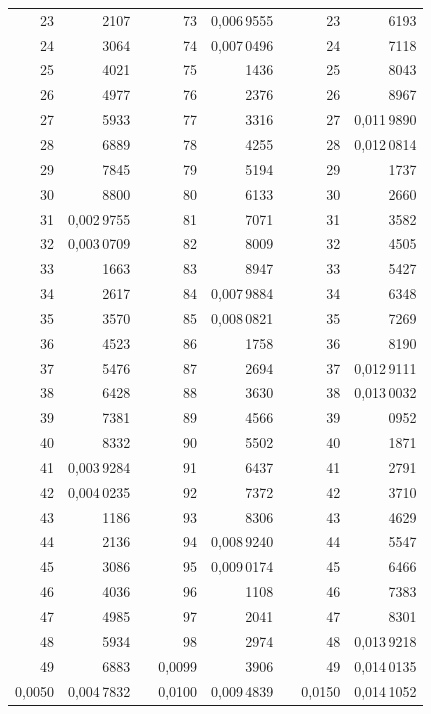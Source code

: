 \begin{tabular}{|r|r|@{}p{9pt}@{}|r|r|@{}p{9pt}@{}|r|r|}
23 & 2107 &  & 73 & 0,006\,9555 &  & 23 & 6193 \\
24 & 3064 &  & 74 & 0,007\,0496 &  & 24 & 7118 \\
25 & 4021 &  & 75 & 1436 &  & 25 & 8043 \\[3pt]
26 & 4977 &  & 76 & 2376 &  & 26 & 8967 \\
27 & 5933 &  & 77 & 3316 &  & 27 & 0,011\,9890 \\
28 & 6889 &  & 78 & 4255 &  & 28 & 0,012\,0814 \\
29 & 7845 &  & 79 & 5194 &  & 29 & 1737 \\
30 & 8800 &  & 80 & 6133 &  & 30 & 2660 \\[3pt]
31 & 0,002\,9755 &  & 81 & 7071 &  & 31 & 3582 \\
32 & 0,003\,0709 &  & 82 & 8009 &  & 32 & 4505 \\
33 & 1663 &  & 83 & 8947 &  & 33 & 5427 \\
34 & 2617 &  & 84 & 0,007\,9884 &  & 34 & 6348 \\
35 & 3570 &  & 85 & 0,008\,0821 &  & 35 & 7269 \\[3pt]
36 & 4523 &  & 86 & 1758 &  & 36 & 8190 \\
37 & 5476 &  & 87 & 2694 &  & 37 & 0,012\,9111 \\
38 & 6428 &  & 88 & 3630 &  & 38 & 0,013\,0032 \\
39 & 7381 &  & 89 & 4566 &  & 39 & 0952 \\
40 & 8332 &  & 90 & 5502 &  & 40 & 1871 \\[3pt]
41 & 0,003\,9284 &  & 91 & 6437 &  & 41 & 2791 \\
42 & 0,004\,0235 &  & 92 & 7372 &  & 42 & 3710 \\
43 & 1186 &  & 93 & 8306 &  & 43 & 4629 \\
44 & 2136 &  & 94 & 0,008\,9240 &  & 44 & 5547 \\
45 & 3086 &  & 95 & 0,009\,0174 &  & 45 & 6466 \\[3pt]
46 & 4036 &  & 96 & 1108 &  & 46 & 7383 \\
47 & 4985 &  & 97 & 2041 &  & 47 & 8301 \\
48 & 5934 &  & 98 & 2974 &  & 48 & 0,013\,9218 \\
49 & 6883 &  & 0,0099 & 3906 &  & 49 & 0,014\,0135 \\
0,0050 & 0,004\,7832 &  & 0,0100 & 0,009\,4839 &  & 0,0150 & 0,014\,1052 \\
\hline
\end{tabular}\par
